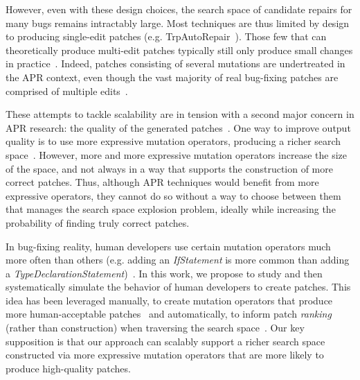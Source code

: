 \documentclass[conference]{IEEEtran}
\begin{document}
However, even with these design choices, the search space of candidate
repairs for many bugs remains intractably large.  Most techniques are thus
limited by design to producing single-edit patches (e.g. TrpAutoRepair~\cite{Qi13TrpAutoR}). 
Those few that can theoretically produce multi-edit patches
typically still only produce small changes in
practice~\cite{Qi15,arcuri11,Mechtaev2016}. 
Indeed, patches
consisting of several mutations are undertreated in the APR context, even though the vast majority
of real bug-fixing patches are comprised of multiple edits~\cite{Soto16,zhong15}.

These attempts to tackle scalability are in tension with a second major concern
in APR research: the quality of the generated patches~\cite{Qi15}.  One way to
improve output quality is to use more expressive mutation operators, producing a
richer search space~\cite{long16}.  However, more and more expressive mutation
operators increase the size of the 
space, and not always in a way that supports the construction of more correct
patches.  Thus, although APR techniques would benefit from more expressive
operators, they cannot do so without a way to choose between them that manages
the search space explosion problem, ideally while increasing the probability
of finding truly correct patches.

In bug-fixing reality, human developers use
certain mutation operators much more often than others (e.g. adding an \emph{IfStatement} is more common than adding a \emph{TypeDeclarationStatement})~\cite{Soto16}. In this
work, we propose to study
and then systematically simulate the behavior of human developers to create
patches. This idea has been leveraged manually, to create
mutation operators that produce more human-acceptable patches~\cite{kim2013} and
automatically, to inform patch \emph{ranking} (rather than
construction) when traversing the search space~\cite{xuan16,long16proph}. 
Our key supposition is that our approach can scalably support a richer
search space constructed via more expressive mutation operators that are more
likely to produce high-quality patches.  
\end{document}
